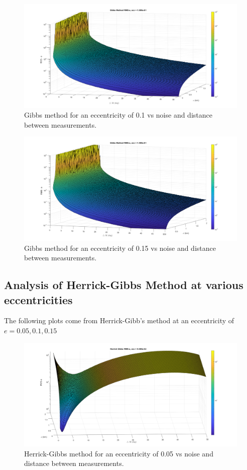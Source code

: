 \documentclass[12pt]{article}
\begin{document}
	\begin{figure}
	\centering
	\includegraphics[width=0.7\linewidth]{gibbs_e_1}
	\caption{Gibbs method for an eccentricity of 0.1 vs noise and distance between measurements.}
	\label{fig:gibbse1}
\end{figure}

	\begin{figure}
	\centering
	\includegraphics[width=0.7\linewidth]{gibbs_e_15}
	\caption{Gibbs method for an eccentricity of 0.15 vs noise and distance between measurements.}
	\label{fig:gibbse15}
\end{figure}
	
	\newpage
	\subsection{Analysis of Herrick-Gibbs Method at various eccentricities}
		The following plots come from Herrick-Gibb's method at an eccentricity of $e=0.05,0.1,0.15$
		\begin{figure}
		\centering
		\includegraphics[width=0.7\linewidth]{herrickgibbs_e_05}
		\caption{Herrick-Gibbs method for an eccentricity of 0.05 vs noise and distance between measurements.}
		\label{fig:herrickgibbse05}
	\end{figure}
	
\end{document}
